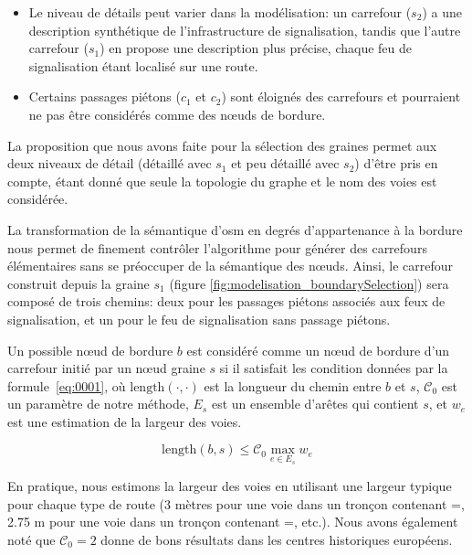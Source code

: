 \begin{itemize}
    \item Le niveau de détails peut varier dans la modélisation: un carrefour ($s_2$) a une description synthétique de l'infrastructure de signalisation, tandis que l'autre carrefour ($s_1$) en propose une description plus précise, chaque feu de signalisation étant localisé sur une route.
    \item Certains passages piétons ($c_1$ et $c_2$) sont éloignés des carrefours et pourraient ne pas être considérés comme des nœuds de bordure.
\end{itemize}

\newpar{}

La proposition que nous avons faite pour la sélection des graines permet aux deux niveaux de détail (détaillé avec $s_1$ et peu détaillé avec $s_2$) d'être pris en compte, étant donné que seule la topologie du graphe et le nom des voies est considérée.

\newpar{}

La transformation de la sémantique d'\gls{osm} en degrés d'appartenance à la bordure nous permet de finement contrôler l'algorithme pour générer des carrefours élémentaires sans se préoccuper de la sémantique des nœuds. Ainsi, le carrefour construit depuis la graine $s_1$ (figure \ref{fig:modelisation_boundarySelection}) sera composé de trois chemins: deux pour les passages piétons associés aux feux de signalisation, et un pour le feu de signalisation sans passage piétons.

\newpar{}

Un possible nœud de bordure $b$ est considéré comme un nœud de bordure d'un carrefour initié par un nœud graine $s$ si il satisfait les condition données par la formule~\ref{eq:0001}, où  $\mathrm{length}(\cdot, \cdot)$ est la longueur du chemin entre $b$ et $s$, $\mathcal{C}_0$ est un paramètre de notre méthode, $E_s$ est un ensemble d'arêtes qui contient $s$, et $w_e$ est une estimation de la largeur des voies.

\begin{equation}
 \mathrm{length}(b, s) \leq \mathcal{C}_0 \max_{e \in E_s} w_e
 \label{eq:0001}
\end{equation}

En pratique, nous estimons la largeur des voies en utilisant une largeur typique pour chaque type de route (3 mètres pour une voie dans un tronçon contenant =, 2.75 m pour une voie dans un tronçon contenant =, etc.). Nous avons également noté que $\mathcal{C}_0=2$ donne de bons résultats dans les centres historiques européens.

